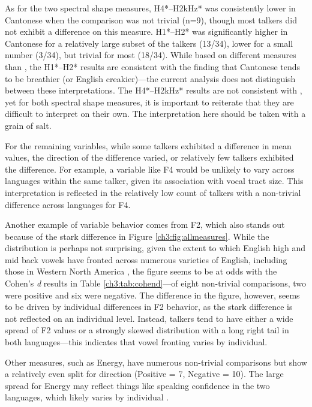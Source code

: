 As for the two spectral shape measures, H4*--H2kHz* was consistently lower in Cantonese when the comparison was not trivial (n=9), though most talkers did not exhibit a difference on this measure. H1*--H2* was significantly higher in Cantonese for a relatively large subset of the talkers (13/34), lower for a small number (3/34), but trivial for most (18/34). While based on different measures than \citep{ng_2012_ltas}, the H1*--H2* results are consistent with the finding that Cantonese tends to be breathier (or English creakier)---the current analysis does not distinguish between these interpretations. The H4*--H2kHz* results are not consistent with \citet{ng_2012_ltas}, yet for both spectral shape measures, it is important to reiterate that they are difficult to interpret on their own. The interpretation here should be taken with a grain of salt. 

For the remaining variables, while some talkers exhibited a difference in mean values, the direction of the difference varied, or relatively few talkers exhibited the difference. For example, a variable like F4 would be unlikely to vary across languages within the same talker, given its association with vocal tract size. This interpretation is reflected in the relatively low count of talkers with a non-trivial difference across languages for F4. 

Another example of variable behavior comes from F2, which also stands out because of the stark difference in Figure \ref{ch3:fig:allmeasures}. While the distribution is perhaps not surprising, given the extent to which English high and mid back vowels have fronted across numerous varieties of English, including those in Western North America \citep{labov_2008_atlas}, the figure seems to be at odds with the Cohen's \textit{d} results in Table \ref{ch3:tab:cohend}---of eight non-trivial comparisons, two were positive and six were negative. The difference in the figure, however, seems to be driven by individual differences in F2 behavior, as the stark difference is not reflected on an individual level. Instead, talkers tend to have either a wide spread of F2 values or a strongly skewed distribution with a long right tail in both languages---this indicates that vowel fronting varies by individual. 

Other measures, such as Energy, have numerous non-trivial comparisons but show a relatively even split for direction (Positive = 7, Negative = 10). The large spread for Energy may reflect things like speaking confidence in the two languages, which likely varies by individual \citep{jarvinen_2013_speaking}.

